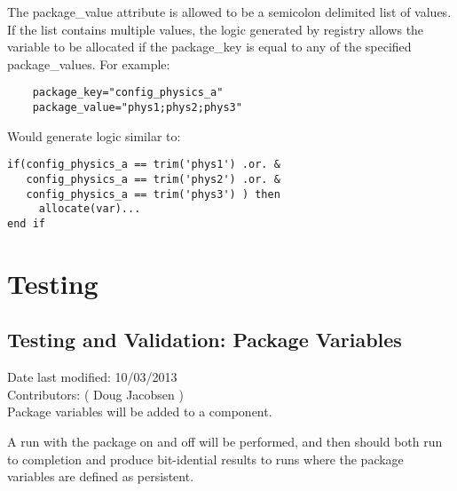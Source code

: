 \documentclass[11pt]{report}
\begin{document}
The package\_value attribute is allowed to be a semicolon delimited list of
values. If the list contains multiple values, the logic generated by registry
allows the variable to be allocated if the package\_key is equal to any of the
specified package\_values. For example:
\begin{lstlisting}
	package_key="config_physics_a"
	package_value="phys1;phys2;phys3"
\end{lstlisting}

Would generate logic similar to:
\begin{lstlisting}
if(config_physics_a == trim('phys1') .or. &
   config_physics_a == trim('phys2') .or. &
   config_physics_a == trim('phys3') ) then
     allocate(var)...
end if
\end{lstlisting}


\chapter{Testing}

\section{Testing and Validation: Package Variables}
Date last modified: 10/03/2013 \\
Contributors: ( Doug Jacobsen ) \\

Package variables will be added to a component.

A run with the package on and off will be performed, and then should both run
to completion and produce bit-idential results to runs where the package
variables are defined as persistent.

\end{document}

